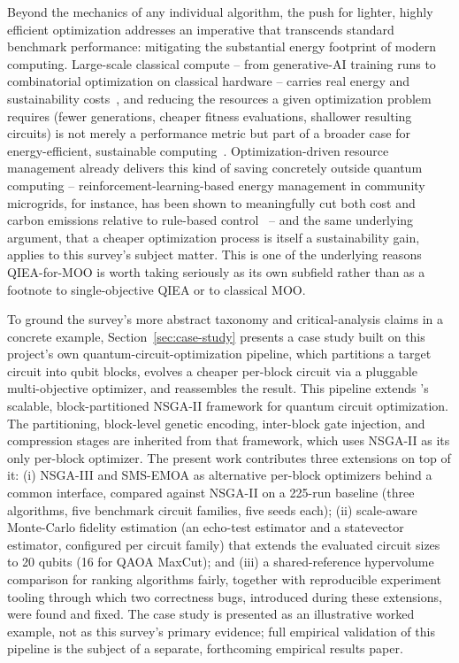 Beyond the mechanics of any individual algorithm, the push for
lighter, highly efficient optimization addresses an imperative that
transcends standard benchmark performance: mitigating the substantial
energy footprint of modern computing. Large-scale
classical compute -- from generative-AI training runs to combinatorial
optimization on classical hardware -- carries real energy and
sustainability costs~\citep{sai2026generative}, and reducing the resources
a given optimization problem requires (fewer generations, cheaper fitness
evaluations, shallower resulting circuits) is not merely a performance
metric but part of a broader case for energy-efficient, sustainable
computing~\citep{banciu2026aiot}. Optimization-driven resource management
already delivers this kind of saving concretely outside quantum computing
-- reinforcement-learning-based energy management in community
microgrids, for instance, has been shown to meaningfully cut both cost
and carbon emissions relative to rule-based
control~\citep{moga2025rlmicrogrid} -- and the same underlying argument,
that a cheaper optimization process is itself a sustainability gain,
applies to this survey's subject matter. This is one of the underlying
reasons
QIEA-for-MOO is worth taking seriously as its own subfield rather than as
a footnote to single-objective QIEA or to classical MOO.

To ground the survey's more abstract taxonomy and critical-analysis
claims in a concrete example, Section~\ref{sec:case-study} presents a
case study built on this project's own quantum-circuit-optimization
pipeline, which partitions a target circuit into qubit blocks, evolves a
cheaper per-block circuit via a pluggable multi-objective optimizer, and
reassembles the result. This pipeline extends
\citet{ghlib2026scalable}'s scalable, block-partitioned NSGA-II framework
for quantum circuit optimization. The partitioning, block-level genetic
encoding, inter-block gate injection, and compression stages are
inherited from that framework, which uses NSGA-II as its only per-block
optimizer. The present work contributes three extensions on top of it:
(i) NSGA-III and SMS-EMOA as alternative per-block optimizers behind a
common interface, compared against NSGA-II on a 225-run baseline (three
algorithms, five benchmark circuit families, five seeds each);
(ii) scale-aware Monte-Carlo fidelity estimation (an echo-test estimator
and a statevector estimator, configured per circuit family) that
extends the evaluated circuit sizes to 20 qubits (16 for QAOA MaxCut);
and (iii) a shared-reference hypervolume comparison for ranking
algorithms fairly, together with reproducible experiment tooling
through which two correctness bugs, introduced during these extensions,
were found and fixed. The case study is presented as an illustrative
worked example, not as this survey's primary evidence; full empirical
validation of this pipeline is the subject of a separate, forthcoming
empirical results paper.

